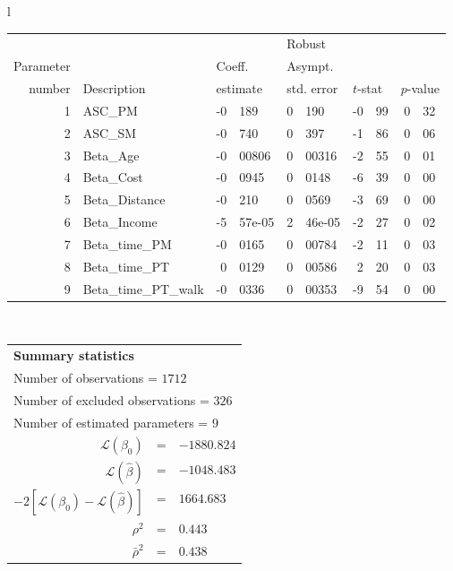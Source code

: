   \begin{tabular}{l}
\begin{tabular}{rlr@{.}lr@{.}lr@{.}lr@{.}l}
         &                       &   \multicolumn{2}{l}{}    & \multicolumn{2}{l}{Robust}  &     \multicolumn{4}{l}{}   \\
Parameter &                       &   \multicolumn{2}{l}{Coeff.}      & \multicolumn{2}{l}{Asympt.}  &     \multicolumn{4}{l}{}   \\
number &  Description                     &   \multicolumn{2}{l}{estimate}      & \multicolumn{2}{l}{std. error}  &   \multicolumn{2}{l}{$t$-stat}  &   \multicolumn{2}{l}{$p$-value}   \\

\hline

1 & ASC_PM  & -0&189 & 0&190 & -0&99 & 0&32\\
2 & ASC_SM & -0&740 & 0&397 & -1&86 & 0&06\\
3 & Beta_Age & -0&00806 & 0&00316 & -2&55 & 0&01\\
4 & Beta_Cost & -0&0945 & 0&0148 & -6&39 & 0&00\\
5 & Beta_Distance & -0&210 & 0&0569 & -3&69 & 0&00\\
6 & Beta_Income & -5&57e-05 & 2&46e-05 & -2&27 & 0&02\\
7 & Beta_time_PM & -0&0165 & 0&00784 & -2&11 & 0&03\\
8 & Beta_time_PT & 0&0129 & 0&00586 & 2&20 & 0&03\\
9 & Beta_time_PT_walk & -0&0336 & 0&00353 & -9&54 & 0&00\\
\hline
\end{tabular}
\\
\begin{tabular}{rcl}
\multicolumn{3}{l}{\bf Summary statistics}\\
\multicolumn{3}{l}{ Number of observations = $1712$} \\
\multicolumn{3}{l}{ Number of excluded observations = $326$} \\
\multicolumn{3}{l}{ Number of estimated  parameters = $9$} \\
 $\mathcal{L}(\beta_0)$ &=&  $-1880.824$ \\
 $\mathcal{L}(\hat{\beta})$ &=& $-1048.483 $  \\
 $-2[\mathcal{L}(\beta_0) -\mathcal{L}(\hat{\beta})]$ &=& $1664.683$ \\
    $\rho^2$ &=&   $0.443$ \\
    $\bar{\rho}^2$ &=&    $0.438$ \\
\end{tabular}
  \end{tabular}
